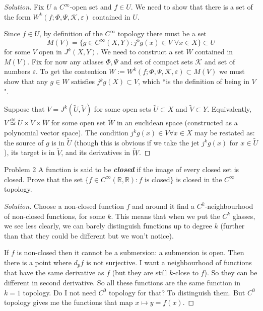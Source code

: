 \begin{proof}[Solution]\leavevmode
Fix \(U\) a \(C^\infty\)-open set and  \(f \in U\). We need to show that there is a set of the form \(W^k(f;\Phi,\Psi,\mathcal{K},\varepsilon)\) contained in \(U\).

Since \(f \in U\), by definition of the \(C^\infty\) topology there must be a set
\[M(V)=\{g \in C^\infty(X,Y): j^kg(x) \in V \;\forall x \in X\} \subset U\]
for some  \(V\) open in \(J^k(X,Y)\). We need to construct a set \(W\) contained in \(M(V)\). Fix for now any atlases  \(\Phi,\Psi\) and set of compact sets \(\mathcal{K}\) and set of numbers \(\varepsilon\). To get the contention \(W:=W^k(f;\Phi,\Psi,\mathcal{K},\varepsilon)\subset M(V)\) we must show that any \(g \in W\) satisfies \(j^kg(X) \subset V\), which ``is the definition of being in \(V\)".

Suppose that \(V= J^k(\tilde{U},\tilde{V})\) for some open sets \(\tilde{U} \subset X\) and \(\tilde{V} \subset Y\). Equivalently, \(V\overset{\operatorname{dif}}{\simeq}\tilde{U} \times \tilde{V} \times \tilde{W}\) for some open set \(\tilde{W}\) in an euclidean space (constructed as a polynomial vector space). The condition \(j^kg(x) \in V \forall  x \in X\) may be restated as: the source of \(g\) is in \(\tilde{U}\) (though this is obvious if we take the jet \(j^kg(x)\) for \(x \in \tilde{U}\)), its target is in \(\tilde{V}\), and its derivatives in \(\tilde{W}\).

\end{proof}

\begin{thing1}{Problem 2}\label{p:2}\leavevmode
A function is said to be \textit{\textbf{closed}} if the image of every closed set is closed. Prove that the set \(\{f \in C^\infty(\mathbb{R},\mathbb{R}): f \text{ is closed} \}\) is closed in the \(C^\infty\) topology.
\end{thing1}

\begin{proof}[Solution]\leavevmode
Choose a non-closed function $f$ and around it find a \(C^k\)-neighbourhood of non-closed functions, for some \(k\). This means that when we put the \(C^k\) glasses, we see less clearly, we can barely distinguish functions up to degree \(k\) (further than that they could be different but we won't notice).

If $f$ is non-closed then it cannot be a submersion: a submersion is open. Then there is a point where \(d_pf\) is not surjective. I want a neighbourhood of functions that have the same derivative as $f$ (but they are still \(k\)-close to $f $). So they can be different in second derivative. So all these functions are the same function in \(k=1\) topology. Do I not need \(C^0\) topology for that? To distinguish them. But \(C^0\) topology gives me the functions that map \(x \mapsto y=f(x)\).
\end{proof}

